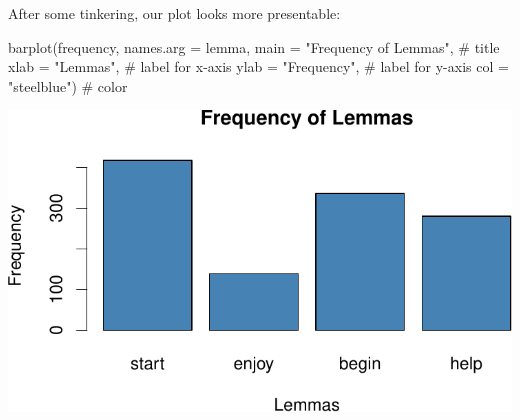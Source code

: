 \documentclass[
  11pt,
  letterpaper,
  DIV=11,
  numbers=noendperiod]{scrreprt}
\newenvironment{Shaded}{\begin{snugshade}}{\end{snugshade}}
\newcommand{\AttributeTok}[1]{\textcolor[rgb]{0.40,0.45,0.13}{#1}}
\newcommand{\CommentTok}[1]{\textcolor[rgb]{0.37,0.37,0.37}{#1}}
\newcommand{\FunctionTok}[1]{\textcolor[rgb]{0.28,0.35,0.67}{#1}}
\newcommand{\NormalTok}[1]{\textcolor[rgb]{0.00,0.23,0.31}{#1}}
\newcommand{\StringTok}[1]{\textcolor[rgb]{0.13,0.47,0.30}{#1}}
\begin{document}
After some tinkering, our plot looks more presentable:

\begin{Shaded}
\begin{Highlighting}[]
\FunctionTok{barplot}\NormalTok{(frequency, }\AttributeTok{names.arg =}\NormalTok{ lemma, }
        \AttributeTok{main =} \StringTok{"Frequency of Lemmas"}\NormalTok{, }\CommentTok{\# title}
        \AttributeTok{xlab =} \StringTok{"Lemmas"}\NormalTok{,  }\CommentTok{\# label for x{-}axis}
        \AttributeTok{ylab =} \StringTok{"Frequency"}\NormalTok{, }\CommentTok{\# label for y{-}axis}
        \AttributeTok{col =} \StringTok{"steelblue"}\NormalTok{) }\CommentTok{\# color}
\end{Highlighting}
\end{Shaded}

\includegraphics{Vectors_Factors_files/figure-pdf/unnamed-chunk-4-1.pdf}
\end{document}
